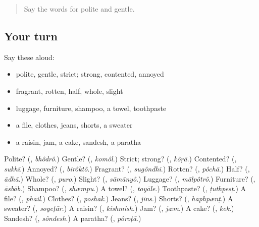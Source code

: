 \label{lesson:BN-R165-second-pass-words-from-chapters-161-165}



\begin{quote}
Say the words for polite and gentle.
\end{quote}

\subsection*{Your turn}
Say these aloud:

\begin{itemize}
\raggedright
  \item polite, gentle, strict; strong, contented, annoyed
  \item fragrant, rotten, half, whole, slight
  \item luggage, furniture, shampoo, a towel, toothpaste
  \item a file, clothes, jeans, shorts, a sweater
  \item a raisin, jam, a cake, sandesh, a paratha
\end{itemize}

\begin{tcolorbox}[breakable,colback=teal!4,colframe=teal!35!black,title={Before you move on}]
Polite? (\textbf{}, \emph{bhôdrô}.) Gentle? (\textbf{}, \emph{komôl}.) Strict; strong? (\textbf{}, \emph{kôṛā}.) Contented? (\textbf{}, \emph{sukhī}.) Annoyed? (\textbf{}, \emph{birôktô}.) Fragrant? (\textbf{}, \emph{sugôndhi}.) Rotten? (\textbf{}, \emph{pôchā}.) Half? (\textbf{}, \emph{ādhā}.) Whole? (\textbf{}, \emph{puro}.) Slight? (\textbf{}, \emph{sāmānyô}.) Luggage? (\textbf{}, \emph{mālpôtrô}.) Furniture? (\textbf{}, \emph{āsbāb}.) Shampoo? (\textbf{}, \emph{shæmpu}.) A towel? (\textbf{}, \emph{toyāle}.) Toothpaste? (\textbf{}, \emph{ṭuthpesṭ}.) A file? (\textbf{}, \emph{phāil}.) Clothes? (\textbf{}, \emph{poshāk}.) Jeans? (\textbf{}, \emph{jins}.) Shorts? (\textbf{}, \emph{hāphpænṭ}.) A sweater? (\textbf{}, \emph{soyeṭār}.) A raisin? (\textbf{}, \emph{kishmish}.) Jam? (\textbf{}, \emph{jæm}.) A cake? (\textbf{}, \emph{kek}.) Sandesh? (\textbf{}, \emph{sôndesh}.) A paratha? (\textbf{}, \emph{pôroṭā}.)
\end{tcolorbox}
